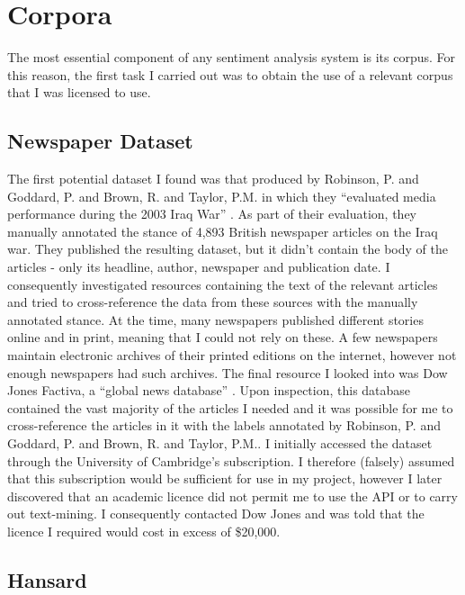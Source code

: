 \documentclass[12pt,a4paper,twoside,openright]{report}
\begin{document}
\section{Corpora}

The most essential component of any sentiment analysis system is its corpus. For this reason, the first task I carried out was to obtain the use of a relevant corpus that I was licensed to use.
 
\subsection{Newspaper Dataset}

The first potential dataset I found was that produced by Robinson, P. and Goddard, P. and Brown, R. and Taylor, P.M. in which they ``evaluated media performance during the 2003 Iraq War'' \cite{iraq_media_study}. As part of their evaluation, they manually annotated the stance of 4,893 British newspaper articles on the Iraq war. They published the resulting dataset, but it didn't contain the body of the articles - only its headline, author, newspaper and publication date. I consequently investigated resources containing the text of the relevant articles and tried to cross-reference the data from these sources with the manually annotated stance. At the time, many newspapers published different stories online and in print, meaning that I could not rely on these. A few newspapers maintain electronic archives of their printed editions on the internet, however not enough newspapers had such archives. The final resource I looked into was Dow Jones Factiva, a ``global news database'' \cite{factiva}. Upon inspection, this database contained the vast majority of the articles I needed and it was possible for me to cross-reference the articles in it with the labels annotated by Robinson, P. and Goddard, P. and Brown, R. and Taylor, P.M.. I initially accessed the dataset through the University of Cambridge's subscription. I therefore (falsely) assumed that this subscription would be sufficient for use in my project, however I later discovered that an academic licence did not permit me to use the API or to carry out text-mining. I consequently contacted Dow Jones and was told that the licence I required would cost in excess of \$20,000.

\subsection{Hansard}
\label{hansard}
\end{document}
